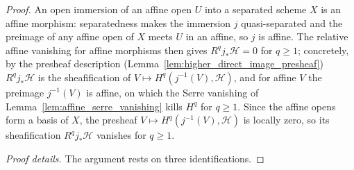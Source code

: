 \begin{proof}
  An open immersion of an affine open \(U\) into a separated scheme \(X\) is an
  affine morphism: separatedness makes the immersion \(j\) quasi-separated and the
  preimage of any affine open of \(X\) meets \(U\) in an affine, so \(j\) is affine.
  The relative affine vanishing for affine morphisms then gives \(R^q j_*\mathcal{H} =
  0\) for \(q \geq 1\); concretely, by the presheaf description
  (Lemma~\ref{lem:higher_direct_image_presheaf}) \(R^q j_*\mathcal{H}\) is the
  sheafification of \(V \mapsto H^q(j^{-1}(V), \mathcal{H})\), and for affine \(V\) the
  preimage \(j^{-1}(V)\) is affine, on which the Serre vanishing of
  Lemma~\ref{lem:affine_serre_vanishing} kills \(H^q\) for \(q \geq 1\). Since the affine
  opens form a basis of \(X\), the presheaf \(V \mapsto H^q(j^{-1}(V), \mathcal{H})\) is
  locally zero, so its sheafification \(R^q j_*\mathcal{H}\) vanishes for \(q \geq 1\).

  \emph{Proof details.} The argument rests on three identifications.


\end{proof}

